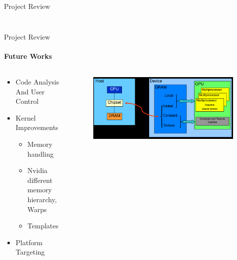 \begin{frame}[t]{Project Review}
\begin{columns}[T]
\begin{column}{.48\textwidth}
\begin{figure}
      \end{figure}
    \end{column}
    \end{columns}
	\end{frame}

	\begin{frame}[t]{Project Review}\framesubtitle{Future Works}
	\begin{columns}[T]
	\begin{column}{0.48\textwidth}
		\begin{itemize}
			\item Code Analysis And User Control
			\item Kernel Improvements
			\begin{itemize}
				\item Memory handling
				\item Nvidia different memory hierarchy, Warps
				\item Templates
			\end{itemize}
			\item Platform Targeting
		\end{itemize}
	\end{column}
	\begin{column}{.48\textwidth}
      \begin{figure}
         \includegraphics[width=1\textwidth]{images/GPUMemoryClear.png}
      \end{figure}
    \end{column}
    \end{columns}
	\end{frame}

